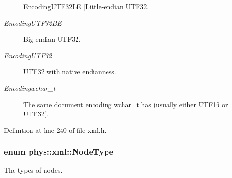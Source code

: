 \begin{Desc}
\begin{description}
{{EncodingUTF32LE}
\label{d9/d27/namespacephys_1_1xml_a420f5de782438f88160321385bea2015a127752883aaf8c9bdb5f66ec725211fc}
}]Little-\/endian UTF32. \item[{\em 
\hypertarget{namespacephys_1_1xml_a420f5de782438f88160321385bea2015a5fb13deaf1552b0f4c00e2b8cafce0b9}{
EncodingUTF32BE}
\label{d9/d27/namespacephys_1_1xml_a420f5de782438f88160321385bea2015a5fb13deaf1552b0f4c00e2b8cafce0b9}
}]Big-\/endian UTF32. \item[{\em 
\hypertarget{namespacephys_1_1xml_a420f5de782438f88160321385bea2015ac61c2f632bd66c2466c29783beb33f8a}{
EncodingUTF32}
\label{d9/d27/namespacephys_1_1xml_a420f5de782438f88160321385bea2015ac61c2f632bd66c2466c29783beb33f8a}
}]UTF32 with native endianness. \item[{\em 
\hypertarget{namespacephys_1_1xml_a420f5de782438f88160321385bea2015a2bc9c8d42796901c8feaa25e17c56cef}{
Encodingwchar\_\-t}
\label{d9/d27/namespacephys_1_1xml_a420f5de782438f88160321385bea2015a2bc9c8d42796901c8feaa25e17c56cef}
}]The same document encoding wchar\_\-t has (usually either UTF16 or UTF32). \end{description}
\end{Desc}



Definition at line 240 of file xml.h.

\hypertarget{namespacephys_1_1xml_a668b0cc666a9d49f7c7222a7552115d3}{
\subsubsection[{NodeType}]{\setlength{\rightskip}{0pt plus 5cm}enum {\bf phys::xml::NodeType}}}
\label{d9/d27/namespacephys_1_1xml_a668b0cc666a9d49f7c7222a7552115d3}


The types of nodes. 


